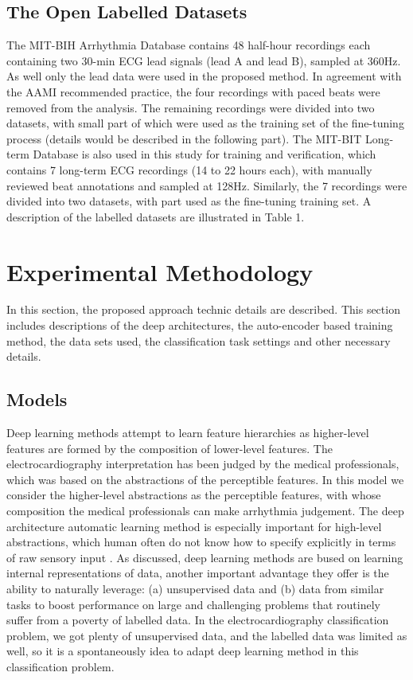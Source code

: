 \documentclass[journal]{IEEEtran}
\begin{document}
\subsection{The Open Labelled Datasets}
The MIT-BIH Arrhythmia Database \cite{physionet} contains 48 half-hour recordings each containing two 30-min ECG lead signals (lead A and lead B), sampled at 360Hz. As well only the  lead \uppercase\expandafter{} data were used in the proposed method. In agreement with the AAMI recommended practice, the four recordings with paced beats were removed from the analysis. The remaining recordings were divided into two datasets, with small part of which were used as the training set of the fine-tuning process (details would be described in the following part).
The MIT-BIT Long-term Database is also used in this study for training and verification, which contains 7 long-term ECG recordings (14 to 22 hours each), with manually reviewed beat annotations and sampled at 128Hz. Similarly, the 7 recordings were divided into two datasets, with part used as the fine-tuning training set. A description of the labelled datasets are illustrated in Table 1.



\section{Experimental Methodology}
In this section, the proposed approach technic details are described. This section includes descriptions of the deep architectures, the auto-encoder based training method, the data sets used, the classification task settings and other necessary details.
\subsection{Models}
Deep learning methods attempt to learn feature hierarchies as higher-level features are formed by the composition of lower-level features. The electrocardiography interpretation has been judged by the medical professionals, which was based on the abstractions of the perceptible features. In this model we consider the higher-level abstractions as the perceptible features, with whose composition the medical professionals can make arrhythmia judgement. The deep architecture automatic learning method is especially important for high-level abstractions, which human often do not know how to specify explicitly in terms of raw sensory input \cite{erhan}. As \cite{collobert} discussed, deep learning methods are bused on learning internal representations of data, another important advantage they offer is the ability to naturally leverage: (a) unsupervised data and (b) data from similar tasks to boost performance on large and challenging problems that routinely suffer from a poverty of labelled data. In the electrocardiography classification problem, we got plenty of unsupervised data, and the labelled data was limited as well, so it is a spontaneously idea to adapt deep learning method in this classification problem.
\end{document}
